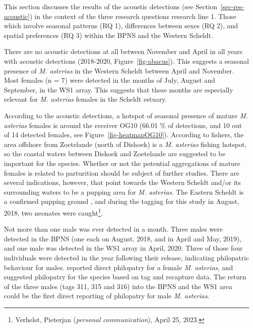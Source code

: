 \documentclass[
  authoryear,
  review,
  3p]{elsarticle}
\begin{document}
This section discusses the results of the acoustic detections (see
Section~\ref{sec-res-acoustic}) in the context of the three research
questions research line 1. Those which involve seasonal patterns (RQ 1),
differences between sexes (RQ 2), and spatial preferences (RQ 3) within
the BPNS and the Western Scheldt.

There are no acoustic detections at all between November and April in
all years with acoustic detections (2018-2020, Figure~\ref{fig-abacus}).
This suggests a seasonal presence of \emph{M. asterias} in the Western
Scheldt between April and November. Most females (n = 7) were detected
in the months of July, August and September, in the WS1 array. This
suggests that these months are especially relevant for \emph{M.
asterias} females in the Scheldt estuary.

According to the acoustic detections, a hotspot of seasonal presence of
mature \emph{M. asterias} females is around the receiver OG10 (66.01 \%
of detections, and 10 out of 14 detected females, see
Figure~\ref{fig-heatmapOG10}). According to fishers, the area offshore
from Zoetelande (north of Dishoek) is a \emph{M. asterias} fishing
hotspot, so the coastal waters between Diskoek and Zoetelande are
suggested to be important for the species. Whether or not the potential
aggregations of mature females is related to parturition should be
subject of further studies. There are several indications, however, that
point towards the Western Scheldt and/or its surrounding waters to be a
pupping area for \emph{M. asterias}. The Eastern Scheldt is a confirmed
pupping ground \citep{breve_2016}, and during the tagging for this study
in August, 2018, two neonates \citep[around 30 cm TL,][]{farrell_2010}
were caught\footnote{Verhelst, Pieterjan (\emph{personal
  communication}), April 25, 2023.}.

Not more than one male was ever detected in a month. Three males were
detected in the BPNS (one each on August, 2018, and in April and May,
2019), and one male was detected in the WS1 array in April, 2020. Three
of those four individuals were detected in the year following their
release, indicating philopatric behaviour for males.
\citet{griffiths_2020} reported direct philopatry for a female \emph{M.
asterias}, and \citet{breve_2016} suggested philopatry for the species
based on tag and recapture data. The return of the three males (tags
311, 315 and 316) into the BPNS and the WS1 area could be the first
direct reporting of philopatry for male \emph{M. asterias}.
\end{document}
